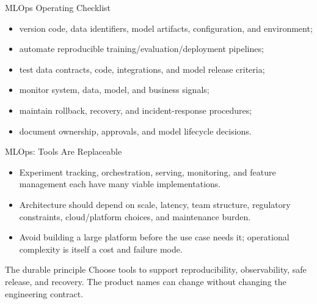 \begin{frame}{MLOps Operating Checklist}
\begin{itemize}
  \item version code, data identifiers, model artifacts, configuration, and environment;
  \item automate reproducible training/evaluation/deployment pipelines;
  \item test data contracts, code, integrations, and model release criteria;
  \item monitor system, data, model, and business signals;
  \item maintain rollback, recovery, and incident-response procedures;
  \item document ownership, approvals, and model lifecycle decisions.
\end{itemize}
\end{frame}

\begin{frame}{MLOps: Tools Are Replaceable}
\begin{itemize}
  \item Experiment tracking, orchestration, serving, monitoring, and feature management each have many viable implementations.
  \item Architecture should depend on scale, latency, team structure, regulatory constraints, cloud/platform choices, and maintenance burden.
  \item Avoid building a large platform before the use case needs it; operational complexity is itself a cost and failure mode.
\end{itemize}

\begin{alertblock}{The durable principle}
Choose tools to support reproducibility, observability, safe release, and recovery. The product names can change without changing the engineering contract.
\end{alertblock}
\end{frame}



